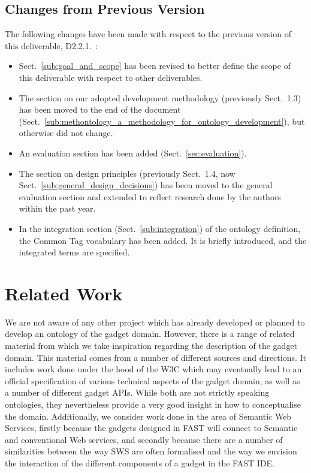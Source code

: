 \documentclass{fast_latex}
\begin{document}

\subsection{Changes from Previous Version} %
\label{sub:changes_from_previous_version}

The following changes have been made with respect to the previous version of this deliverable, D2.2.1.~\cite{moeller2009fast_ontology}:

\begin{itemize}
	\item Sect.~\ref{sub:goal_and_scope} has been revised to better define the scope of this deliverable with respect to other deliverables.
	\item The section on our adopted development methodology (previously Sect.~1.3) has been moved to the end of the document (Sect.~\ref{sub:methontology_a_methodology_for_ontology_development}), but otherwise did not change.
	\item An evaluation section has been added (Sect.~\ref{sec:evaluation}).
	\item The section on design principles (previously Sect.~1.4, now Sect.~\ref{sub:general_design_decisions}) has been moved to the general evaluation section and extended to reflect research done by the authors within the past year.
	\item In the integration section (Sect.~\ref{sub:integration}) of the ontology definition, the Common Tag vocabulary has been added. It is briefly introduced, and the integrated terms are specified.
\end{itemize}



\section{Related Work} %
\label{sec:related_work}

We are not aware of any other project which has already developed or planned to develop an ontology of the gadget domain. However, there is a range of related material from which we take inspiration regarding the description of the gadget domain. This material comes from a number of different sources and directions. It includes work done under the hood of the W3C which may eventually lead to an official specification of various technical aspects of the gadget domain, as well as a number of different gadget APIs. While both are not strictly speaking ontologies, they nevertheless provide a very good insight in how to conceptualise the domain. Additionally, we consider work done in the area of Semantic Web Services, firstly because the gadgets designed in FAST will connect to Semantic and conventional Web services, and secondly because there are a number of similarities between the way SWS are often formalised and the way we envision the interaction of the different components of a gadget in the FAST IDE.
\end{document}

